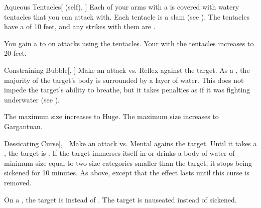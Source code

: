 \lowercase{\hypertarget{spell:Aqueous Tentacles}{}}\label{spell:Aqueous Tentacles}
\begin{attuneability}[Rank 3]{\hypertarget{spell:Aqueous Tentacles}{Aqueous Tentacles}}[ (self), ]
Each of your arms with a  is covered with watery tentacles that you can attack with.
Each tentacle is a slam  (see ).
The tentacles have a  of 10 feet, and any strikes with them are .

\rankline
{} You gain a   to  on attacks using the tentacles.
 Your  with the tentacles increases to 20 feet.
\end{attuneability}
\vspace{0.25em}



\lowercase{\hypertarget{spell:Constraining Bubble}{}}\label{spell:Constraining Bubble}
\begin{freeability}[Rank 3]{\hypertarget{spell:Constraining Bubble}{Constraining Bubble}}[, ]
Make an attack vs. Reflex against the target.
\hit As a , the majority of the target's body is surrounded by a layer of water.
This does not impede the target's ability to breathe, but it takes penalties as if it was fighting underwater (see ).

\rankline
{} The maximum size increases to Huge.
 The maximum size increases to Gargantuan.
\end{freeability}
\vspace{0.25em}



\lowercase{\hypertarget{spell:Dessicating Curse}{}}\label{spell:Dessicating Curse}
\begin{freeability}[Rank 3]{\hypertarget{spell:Dessicating Curse}{Dessicating Curse}}[, ]
Make an attack vs. Mental agains the target.
\hit Until it takes a , the target is .
If the target immerses itself in or drinks a body of water of minimum size equal to two size categories smaller than the target,
it stops being sickened for 10 minutes.
\crit As above, except that the effect lasts until this curse is removed.

\rankline
{} On a , the target is  instead of .
 The target is nauseated instead of sickened.
\end{freeability}
\vspace{0.25em}



